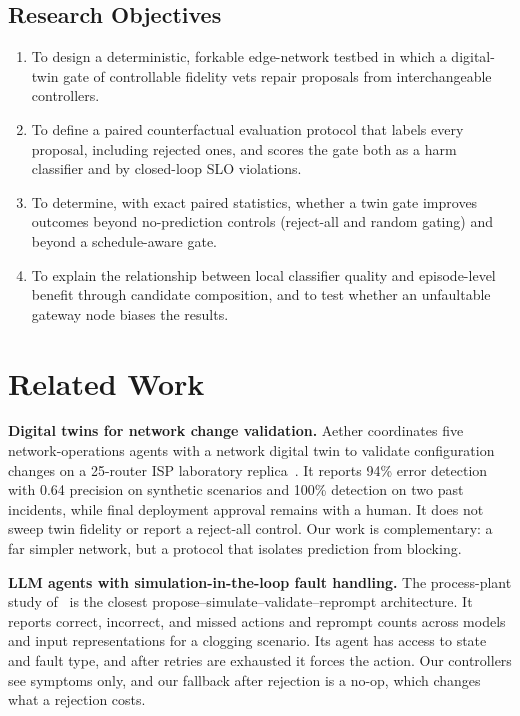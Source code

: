 \documentclass[conference]{IEEEtran}
\begin{document}
\subsection{Research Objectives}

\begin{enumerate}
  \renewcommand{\labelenumi}{\textbf{RO\arabic{enumi}.}}
  \item To design a deterministic, forkable edge-network testbed in which a digital-twin gate of controllable fidelity vets repair proposals from interchangeable controllers.
  \item To define a paired counterfactual evaluation protocol that labels every proposal, including rejected ones, and scores the gate both as a harm classifier and by closed-loop SLO violations.
  \item To determine, with exact paired statistics, whether a twin gate improves outcomes beyond no-prediction controls (reject-all and random gating) and beyond a schedule-aware gate.
  \item To explain the relationship between local classifier quality and episode-level benefit through candidate composition, and to test whether an unfaultable gateway node biases the results.
\end{enumerate}

\section{Related Work}

\textbf{Digital twins for network change validation.} Aether coordinates five network-operations agents with a network digital twin to validate configuration changes on a 25-router ISP laboratory replica~\cite{aether}. It reports 94\% error detection with 0.64 precision on synthetic scenarios and 100\% detection on two past incidents, while final deployment approval remains with a human. It does not sweep twin fidelity or report a reject-all control. Our work is complementary: a far simpler network, but a protocol that isolates prediction from blocking.

\textbf{LLM agents with simulation-in-the-loop fault handling.} The process-plant study of~\cite{processplant} is the closest propose--simulate--validate--reprompt architecture. It reports correct, incorrect, and missed actions and reprompt counts across models and input representations for a clogging scenario. Its agent has access to state and fault type, and after retries are exhausted it forces the action. Our controllers see symptoms only, and our fallback after rejection is a no-op, which changes what a rejection costs.
\end{document}
